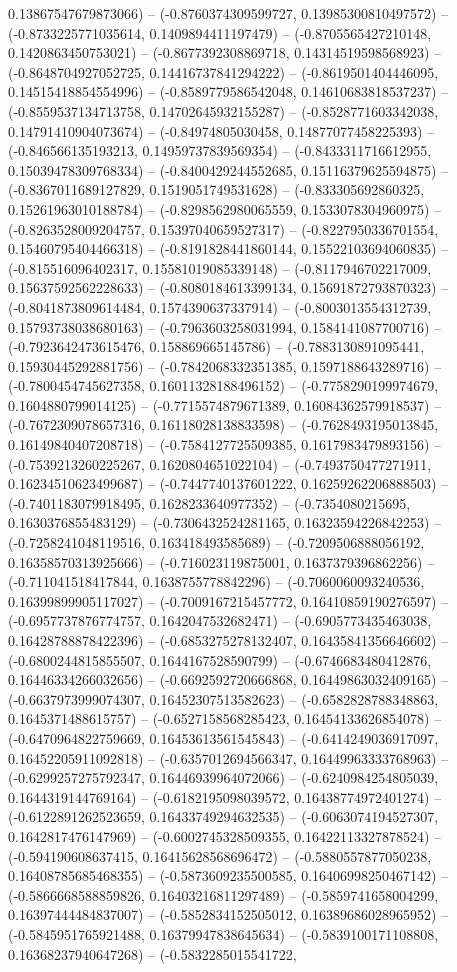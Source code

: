 0.13867547679873066) -- (-0.8760374309599727, 0.13985300810497572) -- (-0.8733225771035614, 0.1409894411197479) -- (-0.8705565427210148, 0.1420863450753021) -- (-0.8677392308869718, 0.14314519598568923) -- (-0.8648704927052725, 0.14416737841294222) -- (-0.8619501404446095, 0.14515418854554996) -- (-0.8589779586542048, 0.14610683818537237) -- (-0.8559537134713758, 0.14702645932155287) -- (-0.8528771603342038, 0.14791410904073674) -- (-0.84974805030458, 0.14877077458225393) -- (-0.846566135193213, 0.14959737839569354) -- (-0.8433311716612955, 0.15039478309768334) -- (-0.8400429244552685, 0.15116379625594875) -- (-0.8367011689127829, 0.1519051749531628) -- (-0.833305692860325, 0.15261963010188784) -- (-0.8298562980065559, 0.1533078304960975) -- (-0.8263528009204757, 0.15397040659527317) -- (-0.8227950336701554, 0.15460795404466318) -- (-0.8191828441860144, 0.15522103694060835) -- (-0.815516096402317, 0.15581019085339148) -- (-0.8117946702217009, 0.15637592562228633) -- (-0.8080184613399134, 0.15691872793870323) -- (-0.8041873809614484, 0.1574390637337914) -- (-0.8003013554312739, 0.15793738038680163) -- (-0.7963603258031994, 0.1584141087700716) -- (-0.7923642473615476, 0.158869665145786) -- (-0.7883130891095441, 0.15930445292881756) -- (-0.7842068332351385, 0.1597188643289716) -- (-0.7800454745627358, 0.16011328188496152) -- (-0.7758290199974679, 0.1604880799014125) -- (-0.7715574879671389, 0.16084362579918537) -- (-0.7672309078657316, 0.16118028138833598) -- (-0.7628493195013845, 0.16149840407208718) -- (-0.7584127725509385, 0.1617983479893156) -- (-0.7539213260225267, 0.1620804651022104) -- (-0.7493750477271911, 0.16234510623499687) -- (-0.7447740137601222, 0.16259262206888503) -- (-0.7401183079918495, 0.1628233640977352) -- (-0.7354080215695, 0.1630376855483129) -- (-0.7306432524281165, 0.16323594226842253) -- (-0.7258241048119516, 0.163418493585689) -- (-0.7209506888056192, 0.16358570313925666) -- (-0.716023119875001, 0.1637379396862256) -- (-0.711041518417844, 0.1638755778842296) -- (-0.7060060093240536, 0.16399899905117027) -- (-0.7009167215457772, 0.16410859190276597) -- (-0.6957737876774757, 0.1642047532682471) -- (-0.6905773435463038, 0.16428788878422396) -- (-0.6853275278132407, 0.16435841356646602) -- (-0.6800244815855507, 0.1644167528590799) -- (-0.6746683480412876, 0.16446334266032656) -- (-0.6692592720666868, 0.16449863032409165) -- (-0.6637973999074307, 0.16452307513582623) -- (-0.6582828788348863, 0.1645371488615757) -- (-0.6527158568285423, 0.16454133626854078) -- (-0.6470964822759669, 0.16453613561545843) -- (-0.6414249036917097, 0.16452205911092818) -- (-0.6357012694566347, 0.16449963333768963) -- (-0.6299257275792347, 0.16446939964072066) -- (-0.6240984254805039, 0.1644319144769164) -- (-0.6182195098039572, 0.16438774972401274) -- (-0.6122891262523659, 0.16433749294632535) -- (-0.6063074194527307, 0.1642817476147969) -- (-0.6002745328509355, 0.16422113327878524) -- (-0.594190608637415, 0.16415628568696472) -- (-0.5880557877050238, 0.16408785685468355) -- (-0.5873609235500585, 0.16406998250467142) -- (-0.5866668588859826, 0.16403216811297489) -- (-0.5859741658004299, 0.16397444484837007) -- (-0.5852834152505012, 0.16389686028965952) -- (-0.5845951765921488, 0.16379947838645634) -- (-0.5839100171108808, 0.16368237940647268) -- (-0.5832285015541722, 